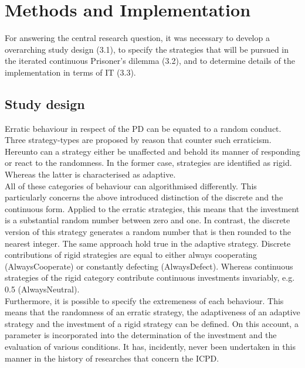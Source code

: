 \documentclass[11pt]{article}
\begin{document}
\section{Methods and Implementation} \label{sec:methods_and_implementation}

For answering the central research question, it was necessary to develop a overarching study design (3.1), to specify the strategies that will be pursued in the iterated continuous Prisoner’s dilemma (3.2), and to determine details of the implementation in terms of IT (3.3).

\subsection{Study design}

Erratic behaviour in respect of the PD can be equated to a random conduct.
Three strategy-types are proposed by reason that counter such erraticism.
Hereunto can a strategy either be unaffected and behold its manner of responding or react to the randomness.
In the former case, strategies are identified as rigid.
Whereas the latter is characterised as adaptive.\\

All of these categories of behaviour can algorithmised differently.
This particularly concerns the above introduced distinction of the discrete and the continuous form.
Applied to the erratic strategies, this means that the investment is a substantial random number between zero and one.
In contrast, the discrete version of this strategy generates a random number that is then rounded to the nearest integer.
The same approach hold true in the adaptive strategy.
Discrete contributions of rigid strategies are equal to either always cooperating (AlwaysCooperate) or constantly defecting (AlwaysDefect).
Whereas continuous strategies of the rigid category contribute continuous investments invariably, e.g. 0.5 (AlwaysNeutral).\\

Furthermore, it is possible to specify the extremeness of each behaviour.
This means that the randomness of an erratic strategy, the adaptiveness of an adaptive strategy and the investment of a rigid strategy can be defined.
On this account, a parameter is incorporated into the determination of the investment and the evaluation of various conditions.
It has, incidently, never been undertaken in this manner in the history of researches that concern the ICPD.\\
\end{document}
